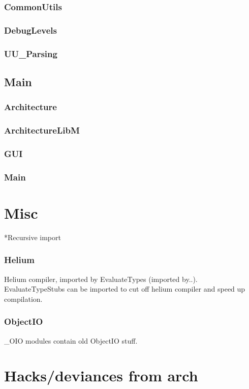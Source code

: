 \documentclass[]{article}
\begin{document}
\subsubsection{CommonUtils}

\subsubsection{DebugLevels}

\subsubsection{UU\_Parsing}

\subsection{Main}
\subsubsection{Architecture}
\subsubsection{ArchitectureLibM}
\subsubsection{GUI}
\subsubsection{Main}

\section{Misc}

*Recursive import

\subsubsection{Helium}
Helium compiler, imported by EvaluateTypes (imported by..). EvaluateTypeStubs can be imported to cut off helium compiler and speed up compilation.

\subsubsection{ObjectIO}
\_OIO modules contain old ObjectIO stuff.

\section{Hacks/deviances from arch}
\end{document}
